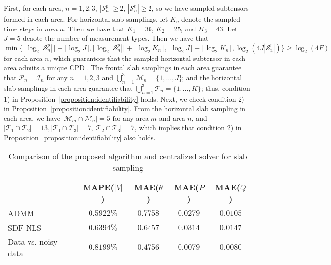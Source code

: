 \documentclass[journal]{IEEEtran}
\newcounter{propose}
\newcounter{thm}
\newcommand{\floor}[1]{\lfloor \log_2{#1}\rfloor}
\begin{document}
First, for each area, $n=1,2,3$, $|\mathcal{S}_n^p|\geq 2$, $|\mathcal{S}_n^t|\geq 2$, so we have sampled subtensors formed in each area. For horizontal slab samplings, let $K_n$ denote the sampled time steps in area $n$. Then we have that $K_1=36$, $K_2=25$, and $K_3=43$. Let $J=5$ denote the number of measurement types. Then
we have that $\min \big\{ \floor{|\mathcal{S}_n^p|} + \floor{J}, \floor{|\mathcal{S}_n^{p}|} + \floor{K_n}, \floor{J} + \floor{K_n}, \log_2(4J|\mathcal{S}_n^t|)\big\} \geq \log_2(4 F)$ for each area $n$, which guarantees that the 
sampled horizontal subtensor in each area admits a unique CPD \cite{Kanatsoulis2020}. The frontal slab samplings in each area guarantee that $\mathcal{P}_n=\mathcal{I}_n$ for any $n=1,2,3$ and  $\bigcup_{n=1}^3 \mathcal{M}_n=\{1,\ldots,J\}$; and  the horizontal slab samplings in each area guarantee that $\bigcup_{n=1}^3 \mathcal{T}_n=\{1,\ldots, K\}$; thus, condition 1) in Proposition~\ref{proposition:identifiability} holds. Next, we check condition 2) in Proposition~\ref{proposition:identifiability}. From the horizontal slab sampling in each area, we have $|\mathcal{M}_m\cap \mathcal{M}_n|=5$ for any area $m$ and area $n$, and $|\mathcal{T}_1\cap \mathcal{T}_2|=13, |\mathcal{T}_1\cap \mathcal{T}_3|=7, |\mathcal{T}_2\cap \mathcal{T}_3|=7$, which implies that condition 2) in   Proposition~\ref{proposition:identifiability} also holds.
\begin{table}
	\renewcommand{\arraystretch}{1}
	\caption{Comparison of the proposed algorithm and centralized solver for slab sampling }\vspace{-10pt}
\label{tab:comparisonofadmmsdf}
	\begin{center}
		\begin{tabular}{l c c c c } 
			\toprule
	            & MAPE($|V|$)  & MAE($\theta$) & MAE($P$) & MAE($Q$) \\
			\midrule
			ADMM &  $0.5922\%$ & $0.7758$ & $0.0279$ & $ 0.0105$ \\
		SDF-NLS & $0.6394\%$ & $0.6457 $ & $0.0314$ & $0.0147$ \\
			Data vs. noisy data & $0.8199\%$ & $0.4756$ & $0.0079$ & $0.0080$  \\
			\bottomrule
		\end{tabular}\vspace{-15pt}
	\end{center}
\end{table}
\end{document}
